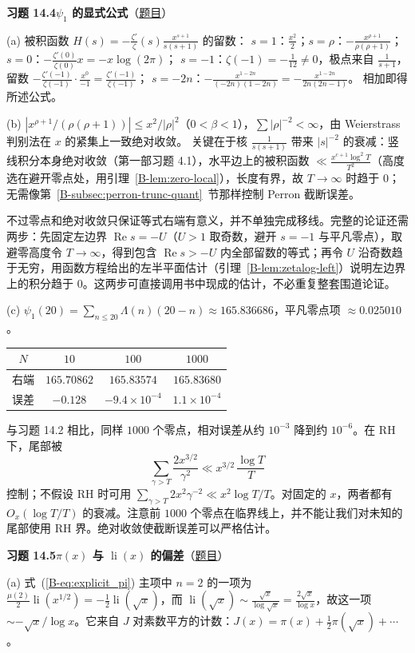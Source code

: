 \documentclass[11pt,a4paper]{article}
\DeclareMathOperator{\li}{li}
\renewcommand{\Re}{\operatorname{Re}}
\newcommand{\bref}[1]{\ref*{B-#1}}
\newcommand{\Sol}[2]{%
  \par\addvspace{1.2em}\noindent
  \hypertarget{s:#1}{}\textbf{习题 #1\quad #2}\hfill{\small（\hyperlink{q:#1}{题目}）}\par
  \nopagebreak\smallskip}
\begin{document}
\Sol{14.4}{$\psi_1$ 的显式公式}
(a) 被积函数 $H(s)=-\frac{\zeta'}{\zeta}(s)\frac{x^{s+1}}{s(s+1)}$ 的留数：
$s=1$：$\frac{x^2}{2}$；$s=\rho$：$-\frac{x^{\rho+1}}{\rho(\rho+1)}$；
$s=0$：$-\frac{\zeta'(0)}{\zeta(0)}x=-x\log(2\pi)$；
$s=-1$：$\zeta(-1)=-\frac1{12}\neq0$，极点来自 $\frac1{s+1}$，留数 $-\frac{\zeta'(-1)}{\zeta(-1)}\cdot\frac{x^0}{-1}=\frac{\zeta'(-1)}{\zeta(-1)}$；
$s=-2n$：$-\frac{x^{1-2n}}{(-2n)(1-2n)}=-\frac{x^{1-2n}}{2n(2n-1)}$。
相加即得所述公式。

(b) $|x^{\rho+1}/(\rho(\rho+1))|\le x^2/|\rho|^2$（$0<\beta<1$），$\sum|\rho|^{-2}<\infty$，由 Weierstrass 判别法在 $x$ 的紧集上一致绝对收敛。
关键在于核 $\frac1{s(s+1)}$ 带来 $|s|^{-2}$ 的衰减：竖线积分本身绝对收敛（第一部习题 4.1），水平边上的被积函数 $\ll\frac{x^{c+1}\log^2T}{T^2}$（高度选在避开零点处，用引理~\bref{lem:zero-local}），长度有界，故 $T\to\infty$ 时趋于 $0$；无需像第~\bref{subsec:perron-trunc-quant}~节那样控制 Perron 截断误差。

不过零点和绝对收敛只保证等式右端有意义，并不单独完成移线。完整的论证还需两步：先固定左边界 $\Re s=-U$（$U>1$ 取奇数，避开 $s=-1$ 与平凡零点），取避零高度令 $T\to\infty$，得到包含 $\Re s>-U$ 内全部留数的等式；再令 $U$ 沿奇数趋于无穷，用函数方程给出的左半平面估计（引理~\bref{lem:zetalog-left}）说明左边界上的积分趋于 $0$。这两步可直接调用书中现成的估计，不必重复整套围道论证。

(c) $\psi_1(20)=\sum_{n\le20}\Lambda(n)(20-n)\approx165.836686$，平凡零点项 $\approx0.025010$。
\begin{center}
\small
\begin{tabular}{@{}cccc@{}}
\toprule
$N$ & $10$ & $100$ & $1000$ \\
\midrule
右端 & $165.70862$ & $165.83574$ & $165.83680$ \\
误差 & $-0.128$ & $-9.4\times10^{-4}$ & $1.1\times10^{-4}$ \\
\bottomrule
\end{tabular}
\end{center}
与习题 14.2 相比，同样 $1000$ 个零点，相对误差从约 $10^{-3}$ 降到约 $10^{-6}$。在 RH 下，尾部被
\[
  \sum_{\gamma>T}\frac{2x^{3/2}}{\gamma^{2}}\ll x^{3/2}\,\frac{\log T}{T}
\]
控制；不假设 RH 时可用 $\sum_{\gamma>T}2x^2\gamma^{-2}\ll x^2\log T/T$。对固定的 $x$，两者都有 $O_x(\log T/T)$ 的衰减。注意前 $1000$ 个零点在临界线上，并不能让我们对未知的尾部使用 RH 界。绝对收敛使截断误差可以严格估计。

\Sol{14.5}{$\pi(x)$ 与 $\li(x)$ 的偏差}
(a) 式~(\bref{eq:explicit_pi}) 主项中 $n=2$ 的一项为 $\frac{\mu(2)}2\li(x^{1/2})=-\frac12\li(\sqrt x)$，而 $\li(\sqrt x)\sim\frac{\sqrt x}{\log\sqrt x}=\frac{2\sqrt x}{\log x}$，故这一项 $\sim-\sqrt x/\log x$。它来自 $J$ 对素数平方的计数：$J(x)=\pi(x)+\frac12\pi(\sqrt x)+\cdots$。
\end{document}
